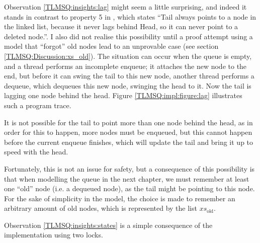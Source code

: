 \documentclass[a4paper, 10pt]{report}
\theoremstyle{definition}
\newcommand{\xsold}{xs_{\mathrm{old}}}
\begin{document}
Observation \ref{TLMSQ:insights:lag} might seem a little surprising, and indeed it stands in contrast to property 5 in \citet{DBLP:conf/podc/MichaelS96}, which states \enquote{Tail always points to a node in the linked list, because it never lags behind Head, so it can never point to a deleted node.}. I also did not realise this possibility until a proof attempt using a model that ``forgot'' old nodes lead to an unprovable case (see section \ref{TLMSQ:Discussion:xs_old}). The situation can occur when the queue is empty, and a thread performs an incomplete enqueue; it attaches the new node to the end, but before it can swing the tail to this new node, another thread performs a dequeue, which dequeues this new node, swinging the head to it. Now the tail is lagging one node behind the head. Figure \ref{TLMSQ:impl:figure:lag} illustrates such a program trace.

It is not possible for the tail to point more than one node behind the head, as in order for this to happen, more nodes must be enqueued, but this cannot happen before the current enqueue finishes, which will update the tail and bring it up to speed with the head.

Fortunately, this is not an issue for safety, but a consequence of this possibility is that when modelling the queue in the next chapter, we must remember at least one ``old'' node (i.e. a dequeued node), as the tail might be pointing to this node. For the sake of simplicity in the model, the choice is made to remember an arbitrary amount of old nodes, which is represented by the list $\xsold$.

Observation \ref{TLMSQ:insights:states} is a simple consequence of the implementation using two locks.
\end{document}
